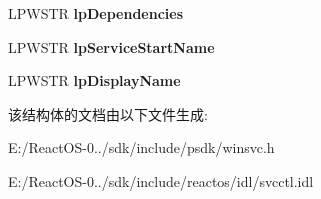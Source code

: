 \begin{DoxyCompactItemize}
L\+P\+W\+S\+TR {\bfseries lp\+Dependencies}
\item 
\mbox{\label{struct___q_u_e_r_y___s_e_r_v_i_c_e___c_o_n_f_i_g_w_a2fcfad32a05559df8a415d52c52e5fae}} 
L\+P\+W\+S\+TR {\bfseries lp\+Service\+Start\+Name}
\item 
\mbox{\label{struct___q_u_e_r_y___s_e_r_v_i_c_e___c_o_n_f_i_g_w_ae6cc7bf41bd6e624d3199a03656adeec}} 
L\+P\+W\+S\+TR {\bfseries lp\+Display\+Name}
\end{DoxyCompactItemize}


该结构体的文档由以下文件生成\+:\begin{DoxyCompactItemize}
\item 
E\+:/\+React\+O\+S-\/0../sdk/include/psdk/winsvc.\+h\item 
E\+:/\+React\+O\+S-\/0../sdk/include/reactos/idl/svcctl.\+idl\end{DoxyCompactItemize}
